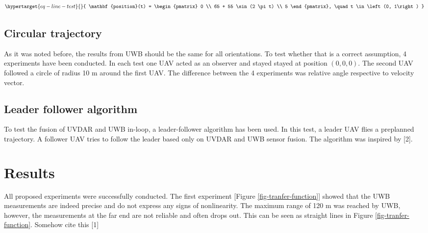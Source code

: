 \documentclass[twoside]{ctustyle/ctuthesis}
\theoremstyle{plain}
\theoremstyle{definition}
\theoremstyle{note}
\begin{document}
\begin{equation}\protect\hypertarget{eq-line-test}{}{
    \mathbf{position}(t) = \begin{pmatrix} 0 \\ 65 + 55 \sin (2 \pi t) \\ 5 \end{pmatrix}, \quad t \in \left(0, 1\right)
}\label{eq-line-test}\end{equation}

\hypertarget{circular-trajectory}{%
\subsection{Circular trajectory}\label{circular-trajectory}}

As it was noted before, the results from UWB should be the same for all
orientations. To test whether that is a correct assumption, 4
experiments have been conducted. In each test one UAV acted as an
observer and stayed stayed at position \(\left(0, 0, 0\right)\). The
second UAV followed a circle of radius 10 m around the first UAV. The
difference between the 4 experiments was relative angle respective to
velocity vector.

\hypertarget{leader-follower-algorithm}{%
\subsection{Leader follower algorithm}\label{leader-follower-algorithm}}

To test the fusion of UVDAR and UWB in-loop, a leader-follower algorithm
has been used. In this test, a leader UAV flies a preplanned trajectory.
A follower UAV tries to follow the leader based only on UVDAR and UWB
sensor fusion. The algorithm was inspired by {[}2{]}.

\hypertarget{results}{%
\section{Results}\label{results}}

All proposed experiments were successfully conducted. The first
experiment {[}Figure \ref{fig-tranfer-function}{]} showed that the UWB
measurements are indeed precise and do not express any signs of
nonlinearity. The maximum range of 120 m was reached by UWB, however,
the measurements at the far end are not reliable and often drops out.
This can be seen as straight lines in Figure \ref{fig-tranfer-function}.
Somehow cite this {[}1{]}
\end{document}
